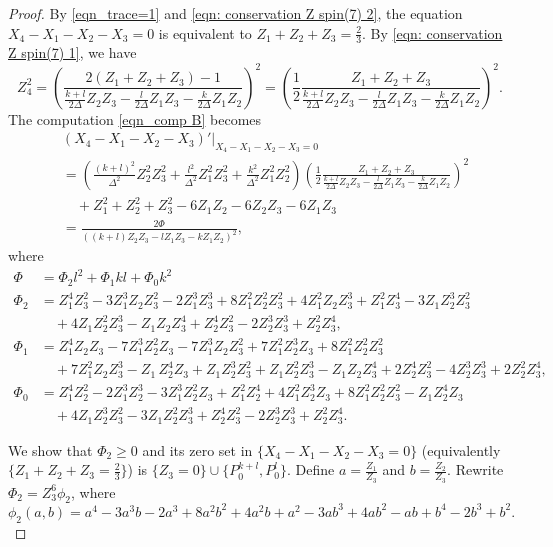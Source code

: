 \documentclass[11pt,letterpaper]{amsart}
\theoremstyle{definition}
\numberwithin{equation}{section}
\begin{document}
\begin{proof}
By \eqref{eqn_trace=1} and \eqref{eqn: conservation Z spin(7) 2}, the equation $X_4-X_1-X_2-X_3=0$ is equivalent to $Z_1+Z_2+Z_3=\frac{2}{3}$. By \eqref{eqn: conservation Z spin(7) 1}, we have
$$Z_4^2=\left(\frac{2(Z_1+Z_2+Z_3)-1}{\frac{k+l}{2\Delta}Z_2Z_3-\frac{l}{2\Delta}Z_1Z_3-\frac{k}{2\Delta}Z_1Z_2}\right)^2=\left(\frac{1}{2}\frac{Z_1+Z_2+Z_3}{\frac{k+l}{2\Delta}Z_2Z_3-\frac{l}{2\Delta}Z_1Z_3-\frac{k}{2\Delta}Z_1Z_2}\right)^2.$$ The computation \eqref{eqn_comp B} becomes
\begin{equation}
\label{eqn_x4-x1-x2-x3}
\begin{split}
&\left.(X_4-X_1-X_2-X_3)'\right|_{X_4-X_1-X_2-X_3=0}\\
&=\left(\frac{(k+l)^2}{\Delta^2}Z_2^2Z_3^2+\frac{l^2}{\Delta^2}Z_1^2Z_3^2+\frac{k^2}{\Delta^2}Z_1^2Z_2^2\right)\left(\frac{1}{2}\frac{Z_1+Z_2+Z_3}{\frac{k+l}{2\Delta}Z_2Z_3-\frac{l}{2\Delta}Z_1Z_3-\frac{k}{2\Delta}Z_1Z_2}\right)^2\\
&\quad +Z_1^2+Z_2^2+Z_3^2-6Z_1Z_2-6Z_2Z_3-6Z_1Z_3\\
&=\frac{2\Phi}{\left((k+l)Z_2Z_3-lZ_1Z_3-kZ_1Z_2\right)^2},
\end{split}
\end{equation}
where 
\begin{equation}
\begin{split}
\Phi &=\Phi_2l^2+\Phi_1kl+\Phi_0k^2\\
\Phi_2&=Z_1^{4} Z_3^{2}-3 Z_1^{3} Z_2 Z_3^{2}-2 Z_1^{3} Z_3^{3}+8 Z_1^{2} Z_2^{2} Z_3^{2}+4 Z_1^{2} Z_2 Z_3^{3}+Z_1^{2} Z_3^{4}-3 Z_1 Z_2^{3} Z_3^{2}\\
&\quad +4 Z_1 Z_2^{2} Z_3^{3}-Z_1 Z_2Z_3^{4}+Z_2^{4} Z_3^{2}-2 Z_2^{3} Z_3^{3}+Z_2^{2} Z_3^{4},\\
\Phi_1&=Z_1^{4} Z_2 Z_3-7 Z_1^{3} Z_2^{2} Z_3-7 Z_1^{3} Z_2 Z_3^{2}+7 Z_1^{2} Z_2^{3} Z_3+8 Z_1^{2} Z_2^{2} Z_3^{2}\\
&\quad +7 Z_1^{2} Z_2 Z_3^{3}-Z_1 \,Z_2^{4} Z_3+Z_1 Z_2^{3} Z_3^{2}+Z_1Z_2^{2} Z_3^{3}-Z_1 Z_2 Z_3^{4}+2 Z_2^{4} Z_3^{2}-4 Z_2^{3} Z_3^{3}+2 Z_2^{2} Z_3^{4},\\
\Phi_0&=Z_1^{4} Z_2^{2}-2 Z_1^{3} Z_2^{3}-3 Z_1^{3} Z_2^{2} Z_3+Z_1^{2} Z_2^{4}+4 Z_1^{2} Z_2^{3} Z_3+8 Z_1^{2} Z_2^{2} Z_3^{2}-Z_1 Z_2^{4} Z_3\\
&\quad +4 Z_1 Z_2^{3} Z_3^{2}-3 Z_1 Z_2^{2} Z_3^{3}+Z_2^{4} Z_3^{2}-2 Z_2^{3} Z_3^{3}+Z_2^{2} Z_3^{4}.
\end{split}
\end{equation}

We show that $\Phi_2 \ge 0$ and its zero set in $\{X_4-X_1-X_2-X_3=0\}$ (equivalently $\{Z_1+Z_2+Z_3=\frac{2}{3}\}$) is $\{Z_3 = 0\}\cup\{P_0^{k+l},P_0^l\}$. Define $a=\frac{Z_1}{Z_3}$ and $b=\frac{Z_2}{Z_3}$. Rewrite $\Phi_2=Z_3^6\phi_2$, where
\begin{equation}
\phi_2(a,b)=a^4-3a^3b-2a^3+8a^2b^2+4a^2b+a^2-3ab^3+4ab^2-ab+b^4-2b^3+b^2.
\end{equation}


\end{proof}
\end{document}
